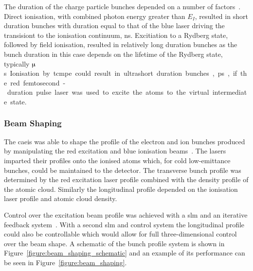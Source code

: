 The duration of the charge particle bunches depended on a number of factors~\cite{speirs_identification_2017}.
Direct ionisation, with combined photon energy greater than $E_I$, resulted in short duration bunches with duration equal to that of the blue laser driving the transisiont to the ionisation continuum, \unit[5]{ns}.
Excitiation to a Rydberg state, followed by field ionisation, resulted in relatively long duration bunches as the bunch duration in this case depends on the lifetime of the Rydberg state, typically \unit[10s]{$\muup$s}.
Ionisation by \gls{tcmpe} could result in ultrashort duration bunches, \unit[10]{ps}, if the red femtosecond-duration pulse laser was used to excite the atoms to the virtual intermediate state.

\subsubsection{Beam Shaping}

The \gls{caeis} was able to shape the profile of the electron and ion bunches produced by manipulating the red excitation and blue ionisation beams~\cite{mcculloch_arbitrarily_2011}.
The lasers imparted their profiles onto the ionised atoms which, for cold low-emittance bunches, could be maintained to the detector.
The transverse bunch profile was determined by the red excitation laser profile combined with the density profile of the atomic cloud.
Similarly the longitudinal profile depended on the ionisation laser profile and atomic cloud density.

Control over the excitation beam profile was achieved with a \gls{slm} and an iterative feedback system~\cite{van_bijnen_patterned_2015}.
With a second \gls{slm} and control system the longitudinal profile could also be controllable which would allow for full three-dimensional control over the beam shape.
A schematic of the bunch profile system is shown in Figure~\ref{figure:beam_shaping_schematic} and an example of its performance can be seen in Figure~\ref{figure:beam_shaping}.

